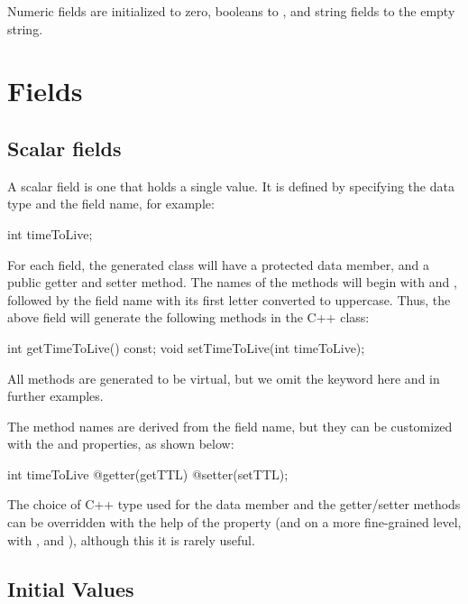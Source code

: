 Numeric fields are initialized to zero, booleans to , and string
fields to the empty string.


\section{Fields}
\label{sec:msg-defs:fields}

\subsection{Scalar fields}
\label{sec:msg-defs:scalar-fields}

A scalar field is one that holds a single value. It is defined by specifying the
data type and the field name, for example:

\begin{msg}
int timeToLive;
\end{msg}

For each field, the generated class will have a protected data member, and a
public getter and setter method. The names of the methods will begin with
 and , followed by the field name with its first letter
converted to uppercase. Thus, the above field will generate the following
methods in the C++ class:

\begin{cpp}
int getTimeToLive() const;
void setTimeToLive(int timeToLive);
\end{cpp}

\begin{note}
All methods are generated to be virtual, but we omit the 
keyword here and in further examples.
\end{note}

The method names are derived from the field name, but they can be customized
with the  and  properties, as shown below:

\begin{msg}
int timeToLive @getter(getTTL) @setter(setTTL);
\end{msg}

The choice of C++ type used for the data member and the getter/setter methods
can be overridden with the help of the  property (and on a more
fine-grained level, with ,  and
), although this it is rarely useful.


\subsection{Initial Values}
\label{sec:msg-defs:initial-values}

